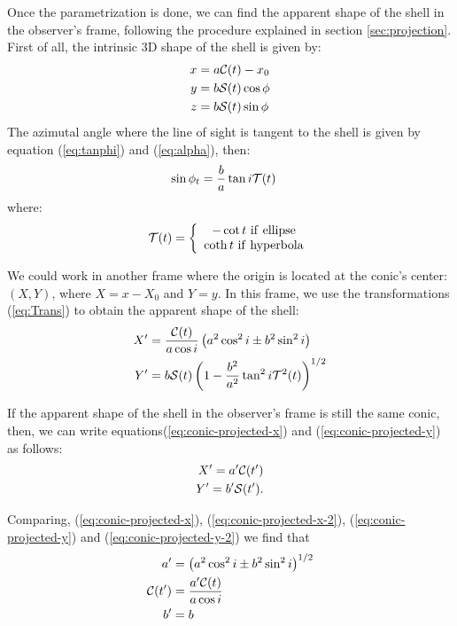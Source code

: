 Once the parametrization is done, we can find the apparent shape of
the shell in the observer's frame, following the procedure explained
in section \ref{sec:projection}.  First of all, the intrinsic 3D shape of the shell is given by:
\begin{align}
x &= a\mathcal{C}(t)-x_0 \\ 
y &= b\mathcal{S}(t)\cos\phi \\
z &=  b\mathcal{S}(t)\sin\phi
\end{align}
The azimutal angle where the line of sight is tangent to the shell is given by equation (\ref{eq:tanphi}) and (\ref{eq:alpha}), then:
\begin{align}
\sin\phi_t &= \frac{b}{a}\tan i\mathcal{T}(t) 
\end{align}
where:
\begin{align}
\mathcal{T}(t) = \left\lbrace \begin{array}{c}
-\cot t ~\mathrm{if~ellipse} \\
\coth t ~\mathrm{if~hyperbola}
\end{array}\right.
\end{align}

We could work in another frame where the origin is located at the conic's center: $(X,Y)$, where $X=x-X_0$ and $Y=y$.
In this frame, we use the transformations (\ref{eq:Trans})  to obtain the apparent shape of the shell:
\begin{align}
X' &= \frac{\mathcal{C}(t)}{a\cos i}\left(a^2\cos^2 i \pm b^2\sin^2 i\right)  \label{eq:conic-projected-x}\\
Y' &= b\mathcal{S}(t)\left(1-\frac{b^2}{a^2}\tan^2 i\mathcal{T}^2(t)\right)^{1/2}
\label{eq:conic-projected-y}
\end{align}


If the apparent shape of the shell in the observer's frame is still the same conic, then, we
can write equations(\ref{eq:conic-projected-x}) and (\ref{eq:conic-projected-y}) as follows:
\begin{align}
X' = a'\mathcal{C}( t') \label{eq:conic-projected-x-2} \\
Y' = b'\mathcal{S} (t') \label{eq:conic-projected-y-2} . 
\end{align}

Comparing, (\ref{eq:conic-projected-x}), (\ref{eq:conic-projected-x-2}), (\ref{eq:conic-projected-y}) and (\ref{eq:conic-projected-y-2}) we find that
\begin{align}
a' &= \left(a^2\cos^2 i \pm b^2\sin^2 i\right)^{1/2} \\
\mathcal{C}(t') &= \frac{a'\mathcal{C}(t)}{a\cos i} \\
b' &= b \label{eq:b-prime}
\end{align} 

